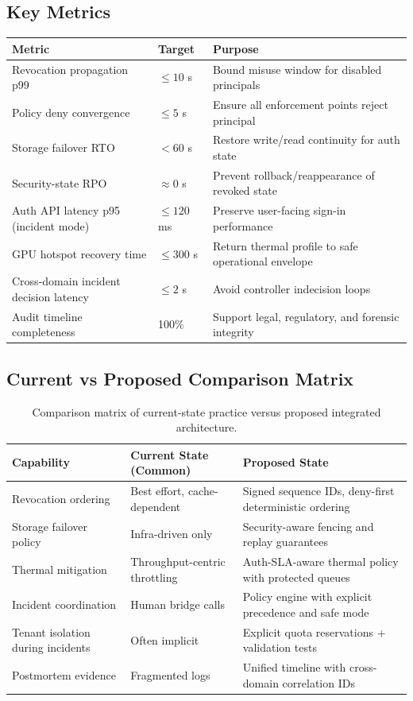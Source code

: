 \documentclass[12pt]{article}
\begin{document}
\subsection{Key Metrics}
\begin{longtable}{p{}p{}p{}}
\toprule
\textbf{Metric} & \textbf{Target} & \textbf{Purpose} \\
\midrule
Revocation propagation p99 & $\leq 10$ s & Bound misuse window for disabled principals \\
Policy deny convergence & $\leq 5$ s & Ensure all enforcement points reject principal \\
Storage failover RTO & $< 60$ s & Restore write/read continuity for auth state \\
Security-state RPO & $\approx 0$ s & Prevent rollback/reappearance of revoked state \\
Auth API latency p95 (incident mode) & $\leq 120$ ms & Preserve user-facing sign-in performance \\
GPU hotspot recovery time & $\leq 300$ s & Return thermal profile to safe operational envelope \\
Cross-domain incident decision latency & $\leq 2$ s & Avoid controller indecision loops \\
Audit timeline completeness & 100\% & Support legal, regulatory, and forensic integrity \\
\bottomrule
\end{longtable}

\subsection{Current vs Proposed Comparison Matrix}
\begin{table}[h]
\centering
\small
\begin{tabular}{p{}p{}p{}}
\toprule
\textbf{Capability} & \textbf{Current State (Common)} & \textbf{Proposed State} \\
\midrule
Revocation ordering & Best effort, cache-dependent & Signed sequence IDs, deny-first deterministic ordering \\
Storage failover policy & Infra-driven only & Security-aware fencing and replay guarantees \\
Thermal mitigation & Throughput-centric throttling & Auth-SLA-aware thermal policy with protected queues \\
Incident coordination & Human bridge calls & Policy engine with explicit precedence and safe mode \\
Tenant isolation during incidents & Often implicit & Explicit quota reservations + validation tests \\
Postmortem evidence & Fragmented logs & Unified timeline with cross-domain correlation IDs \\
\bottomrule
\end{tabular}
\caption{Comparison matrix of current-state practice versus proposed integrated architecture.}
\label{tab:comparison}
\end{table}
\end{document}
